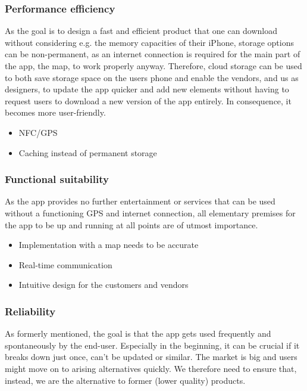 \subsubsection{Performance efficiency}

As the goal is to design a fast and efficient product that one can download without considering e.g. the memory capacities of their iPhone, storage options can be non-permanent, as an internet connection is required for the main part of the app, the map, to work properly anyway. Therefore, cloud storage can be used to both save storage space on the users phone and enable the vendors, and us as designers, to update the app quicker and add new elements without having to request users to download a new version of the app entirely. In consequence, it becomes more user-friendly.

\begin{itemize}
\item NFC/GPS
\item Caching instead of permanent storage
\end{itemize}



\subsubsection{Functional suitability}

As the app provides no further entertainment or services that can be used without a functioning GPS and internet connection, all elementary premises for the app to be up and running at all points are of utmost importance.

\begin{itemize}
\item Implementation with a map needs to be accurate
\item Real-time communication
\item Intuitive design for the customers and vendors
\end{itemize}


\subsubsection{Reliability}

As formerly mentioned, the goal is that the app gets used frequently and spontaneously by the end-user. Especially in the beginning, it can be crucial if it breaks down just once, can’t be updated or similar. The market is big and users might move on to arising alternatives quickly. We therefore need to ensure that, instead, we are the alternative to former (lower quality) products.



